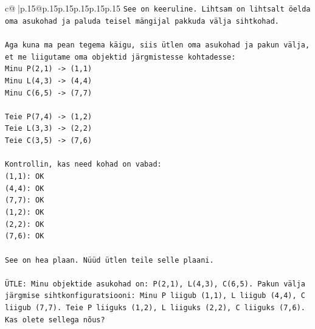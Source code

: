 \documentclass{article}
\begin{document}
{\begin{supertabular}{c@{$\;$}|p{.15\linewidth}@{}p{.15\linewidth}p{.15\linewidth}p{.15\linewidth}p{.15\linewidth}p{.15\linewidth}}
{{{\texttt{See on keeruline. Lihtsam on lihtsalt öelda oma asukohad ja paluda teisel mängijal pakkuda välja sihtkohad.} \\
\\ 
\texttt{Aga kuna ma pean tegema käigu, siis ütlen oma asukohad ja pakun välja, et me liigutame oma objektid järgmistesse kohtadesse:} \\
\texttt{Minu P(2,1) {-}> (1,1)} \\
\texttt{Minu L(4,3) {-}> (4,4)} \\
\texttt{Minu C(6,5) {-}> (7,7)} \\
\\ 
\texttt{Teie P(7,4) {-}> (1,2)} \\
\texttt{Teie L(3,3) {-}> (2,2)} \\
\texttt{Teie C(3,5) {-}> (7,6)} \\
\\ 
\texttt{Kontrollin, kas need kohad on vabad:} \\
\texttt{(1,1): OK} \\
\texttt{(4,4): OK} \\
\texttt{(7,7): OK} \\
\texttt{(1,2): OK} \\
\texttt{(2,2): OK} \\
\texttt{(7,6): OK} \\
\\ 
\texttt{See on hea plaan. Nüüd ütlen teile selle plaani.} \\
\\ 
\texttt{ÜTLE: Minu objektide asukohad on: P(2,1), L(4,3), C(6,5). Pakun välja järgmise sihtkonfiguratsiooni: Minu P liigub (1,1), L liigub (4,4), C liigub (7,7). Teie P liiguks (1,2), L liiguks (2,2), C liiguks (7,6). Kas olete sellega nõus?} \\
            }
        }
    }
     \\ \\


\end{supertabular}}
\end{document}
